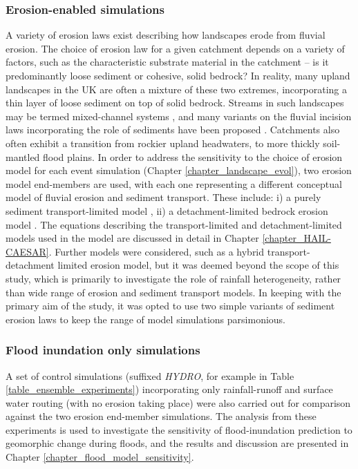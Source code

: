 \subsubsection{Erosion-enabled simulations}
A variety of erosion laws exist describing how landscapes erode from fluvial erosion. The choice of erosion law for a given catchment depends on a variety of factors, such as the characteristic substrate material in the catchment -- is it predominantly loose sediment or cohesive, solid bedrock? In reality, many upland landscapes in the UK are often a mixture of these two extremes, incorporating a thin layer of loose sediment on top of solid bedrock. Streams in such landscapes may be termed mixed-channel systems \citep{howard1998long}, and many variants on the fluvial incision laws incorporating the role of sediments have been proposed \citep{Lague2005,sklar2006role}. Catchments also often exhibit a transition from rockier upland headwaters, to more thickly soil-mantled flood plains. In order to address the sensitivity to the choice of erosion model for each event simulation (Chapter \ref{chapter_landscape_evol}), two erosion model end-members are used, with each one representing a different conceptual model of fluvial erosion and sediment transport. These include: i) a purely sediment transport-limited model \citep{wilcock2003surface}, ii) a detachment-limited bedrock erosion model \citep{howard1983channel,stock1999geologic,whipple1999dynamics}. The equations describing the transport-limited and detachment-limited models used in the model are discussed in detail in Chapter \ref{chapter_HAIL-CAESAR}. Further models were considered, such as a hybrid transport-detachment limited erosion model, but it was deemed beyond the scope of this study, which is primarily to investigate the role of rainfall heterogeneity, rather than wide range of erosion and sediment transport models. In keeping with the primary aim of the study, it was opted to use two simple variants of sediment erosion laws to keep the range of model simulations parsimonious. 

\subsubsection{Flood inundation only simulations}
A set of control simulations (suffixed \textit{HYDRO}, for example in Table \ref{table_ensemble_experiments}) incorporating only rainfall-runoff and surface water routing (with no erosion taking place) were also carried out for comparison against the two erosion end-member simulations. The analysis from these experiments is used to investigate the sensitivity of flood-inundation prediction to geomorphic change during floods, and the results and discussion are presented in Chapter \ref{chapter_flood_model_sensitivity}.

